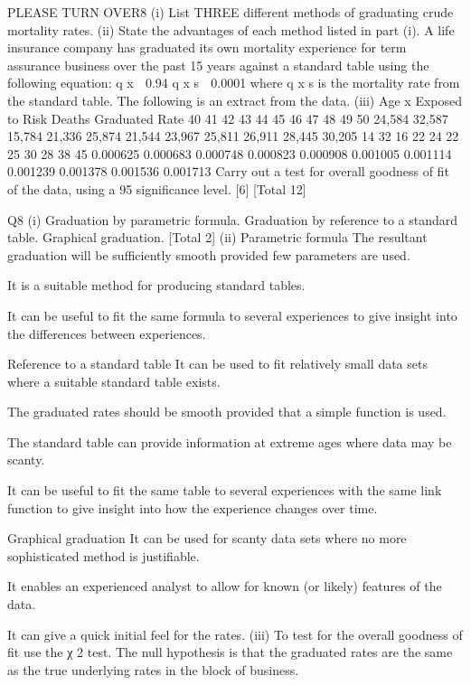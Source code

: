\documentclass[a4paper,12pt]{article}
\begin{document}


PLEASE TURN OVER8
(i) List THREE different methods of graduating crude mortality rates. 
(ii) State the advantages of each method listed in part (i). 
A life insurance company has graduated its own mortality experience for term
assurance business over the past 15 years against a standard table using the following
equation:
q x  0.94 q x s  0.0001
where q x s is the mortality rate from the standard table.
The following is an extract from the data.
(iii)
Age x Exposed to Risk Deaths Graduated Rate
40
41
42
43
44
45
46
47
48
49
50 24,584
32,587
15,784
21,336
25,874
21,544
23,967
25,811
26,911
28,445
30,205 14
32
16
22
24
22
25
30
28
38
45 0.000625
0.000683
0.000748
0.000823
0.000908
0.001005
0.001114
0.001239
0.001378
0.001536
0.001713
Carry out a test for overall goodness of fit of the data, using a 95%
significance level.
[6]
[Total 12]

Q8
(i)
Graduation by parametric formula.
Graduation by reference to a standard table.
Graphical graduation.
[Total 2]
(ii)
Parametric formula
The resultant graduation will be sufficiently smooth provided few parameters
are used.

It is a suitable method for producing standard tables.

It can be useful to fit the same formula to several experiences to give insight
into the differences between experiences.

Reference to a standard table
It can be used to fit relatively small data sets where a suitable standard table
exists.

The graduated rates should be smooth provided that a simple function is used.

The standard table can provide information at extreme ages where data may be
scanty.

It can be useful to fit the same table to several experiences with the same link
function to give insight into how the experience changes over time.

Graphical graduation
It can be used for scanty data sets where no more sophisticated method is
justifiable.

It enables an experienced analyst to allow for known (or likely) features of the
data.

It can give a quick initial feel for the rates.
(iii)
To test for the overall goodness of fit use the χ 2 test.
The null hypothesis is that the graduated rates are the same as the true
underlying rates in the block of business.
\end{document}
